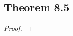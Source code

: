 \documentclass[../../main.tex]{subfiles}
\begin{document}
\subsection{Theorem 8.5}
\begin{wts}

\end{wts}
\begin{proof}

\end{proof}
\end{document}
